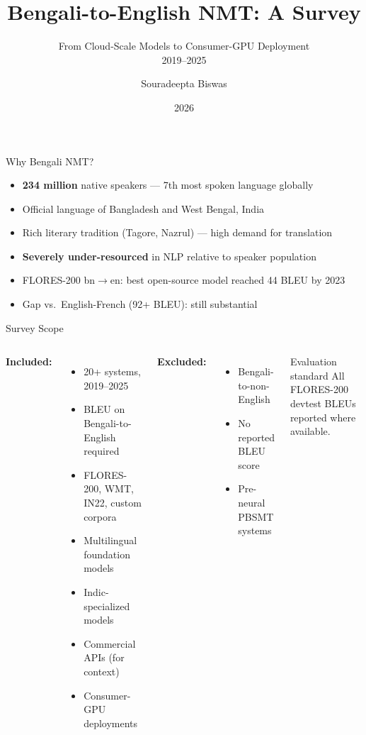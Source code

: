 \documentclass[aspectratio=169,10pt]{beamer}
\title{Bengali-to-English NMT: A Survey}
\subtitle{From Cloud-Scale Models to Consumer-GPU Deployment\\
2019--2025}
\author{Souradeepta Biswas}
\institute{Independent Researcher}
\date{2026}
\begin{document}
\begin{frame}
  \titlepage
\end{frame}

\begin{frame}{Why Bengali NMT?}
  \begin{itemize}
    \item \textbf{234 million} native speakers --- 7th most spoken language globally
    \item Official language of Bangladesh and West Bengal, India
    \item Rich literary tradition (Tagore, Nazrul) --- high demand for translation
    \item \textbf{Severely under-resourced} in NLP relative to speaker population
    \item FLORES-200 bn$\to$en: best open-source model reached 44 BLEU by 2023
    \item Gap vs.\ English-French (92+ BLEU): still substantial
  \end{itemize}
\end{frame}

\begin{frame}{Survey Scope}
  \begin{columns}
    \textbf{Included:}
    \begin{itemize}
      \item 20+ systems, 2019--2025
      \item BLEU on Bengali-to-English required
      \item FLORES-200, WMT, IN22, custom corpora
      \item Multilingual foundation models
      \item Indic-specialized models
      \item Commercial APIs (for context)
      \item Consumer-GPU deployments
    \end{itemize}

    \textbf{Excluded:}
    \begin{itemize}
      \item Bengali-to-non-English
      \item No reported BLEU score
      \item Pre-neural PBSMT systems
    \end{itemize}
    \vspace{0.3cm}
    \begin{block}{Evaluation standard}
      All FLORES-200 devtest BLEUs\\
      reported where available.
    \end{block}
  \end{columns}
\end{frame}
\end{document}

